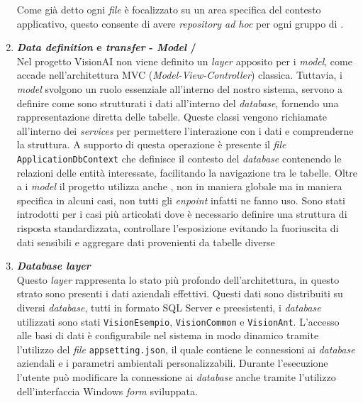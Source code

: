 \begin{enumerate}
    Come già detto ogni \textit{file} è focalizzato su un area specifica del contesto applicativo, questo consente di avere \textit{repository ad hoc} per ogni gruppo di .
    \item \textbf{\textit{Data definition} e \textit{transfer} - \textit{Model} / } \\
    Nel progetto VisionAI non viene definito un \textit{layer} apposito per i  \textit{model}, come accade nell'architettura MVC (\textit{Model-View-Controller}) classica. Tuttavia, i \textit{model} svolgono un ruolo essenziale all'interno del nostro sistema, servono a definire come sono strutturati i dati all'interno del \textit{database}, fornendo una rappresentazione diretta delle tabelle.
    Queste classi vengono richiamate all'interno dei \textit{services} per permettere l'interazione con i dati e comprenderne la struttura. A supporto di questa operazione è presente il \textit{file} \texttt{ApplicationDbContext} che definisce il contesto del \textit{database} contenendo le relazioni delle entità interessate, facilitando la navigazione tra le tabelle.
    Oltre a i \textit{model} il progetto utilizza anche , non in maniera globale ma in maniera specifica in alcuni casi, non tutti gli \textit{enpoint} infatti ne fanno uso. Sono stati introdotti per i casi più articolati dove è necessario definire una struttura di risposta standardizzata, controllare l'esposizione evitando la fuoriuscita di dati sensibili e aggregare dati provenienti da tabelle diverse

    \item \textbf{\textit{Database layer}} \\
    Questo \textit{layer} rappresenta lo stato più profondo dell'architettura, in questo strato sono presenti i dati aziendali effettivi. Questi dati sono distribuiti su diversi \textit{database}, tutti in formato SQL Server e preesistenti, i \textit{database} utilizzati sono stati \texttt{VisionEsempio}, \texttt{VisionCommon} e \texttt{VisionAnt}.
    L'accesso alle basi di dati è configurabile nel sistema in modo dinamico tramite l'utilizzo del \textit{file} \texttt{appsetting.json}, il quale contiene le connessioni ai \textit{database} aziendali e i parametri ambientali personalizzabili.
    Durante l'esecuzione l'utente può modificare la connessione ai \textit{database} anche tramite l'utilizzo dell'interfaccia Windows \textit{form} sviluppata.
\end{enumerate}

